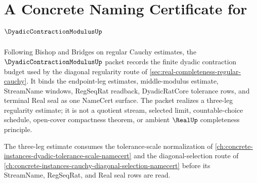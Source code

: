 \chapter{A Concrete Naming Certificate for $\DyadicContractionModulusUp$}
\label{ch:concrete-instances-dyadic-contraction-modulus-namecert}

Following Bishop and Bridges on regular Cauchy estimates, the $\DyadicContractionModulusUp$ packet records the finite dyadic contraction budget used by the diagonal regularity route of \autoref{sec:real-completeness-regular-cauchy}. It binds the endpoint-leg estimates, middle-modulus estimate, StreamName windows, RegSeqRat readback, DyadicRatCore tolerance rows, and terminal Real seal as one NameCert surface. The packet realizes a three-leg regularity estimate; it is not a quotient stream, selected limit, countable-choice schedule, open-cover compactness theorem, or ambient $\RealUp$ completeness principle.

The three-leg estimate consumes the tolerance-scale normalization of \autoref{ch:concrete-instances-dyadic-tolerance-scale-namecert} and the diagonal-selection route of \autoref{ch:concrete-instances-cauchy-diagonal-selection-namecert} before its StreamName, RegSeqRat, and Real seal rows are read.

